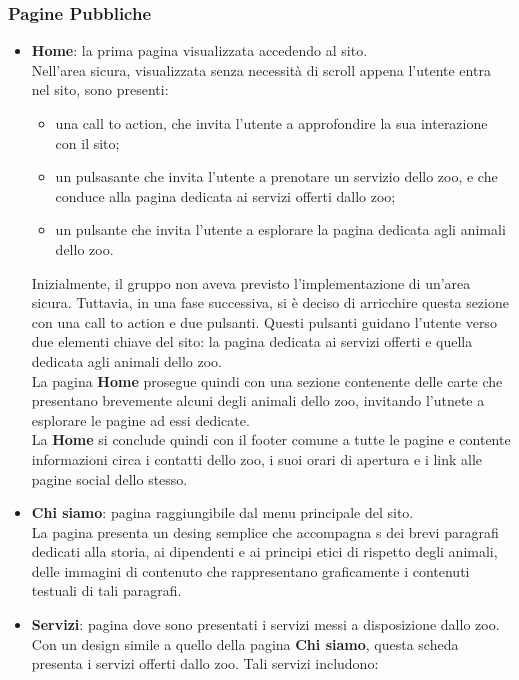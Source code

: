 \subsubsection{Pagine Pubbliche}
\begin{itemize}
    \item \textbf{Home}: la prima pagina visualizzata accedendo al sito.\\
    Nell'area sicura, visualizzata senza necessità di scroll appena l'utente entra nel sito, sono presenti: 
    \begin{itemize}
        \item una call to action, che invita l'utente a approfondire la sua interazione con il sito; 
        \item un pulsasante che invita l'utente a prenotare un servizio dello zoo, e che conduce alla pagina dedicata ai servizi offerti dallo zoo; 
        \item un pulsante che invita l'utente a esplorare la pagina dedicata agli animali dello zoo.
    \end{itemize}
    Inizialmente, il gruppo non aveva previsto l'implementazione di un'area sicura. Tuttavia, in una fase successiva, si è deciso di arricchire questa sezione con una call to action e due pulsanti. Questi pulsanti guidano l'utente verso due elementi chiave del sito: la pagina dedicata ai servizi offerti e quella dedicata agli animali dello zoo.\\
    La pagina \textbf{Home} prosegue quindi con una sezione contenente delle carte che presentano brevemente alcuni degli animali dello zoo, invitando l'utnete a esplorare le pagine ad essi dedicate.\\
    La \textbf{Home} si conclude quindi con il footer comune a tutte le pagine e contente informazioni circa i contatti dello zoo, i suoi orari di apertura e i link alle pagine social dello stesso.
    \item \textbf{Chi siamo}: pagina raggiungibile dal menu principale del sito.\\
    La pagina presenta un desing semplice che accompagna s dei brevi paragrafi dedicati alla storia, ai dipendenti e ai principi etici di rispetto degli animali, delle immagini di contenuto che rappresentano graficamente i contenuti testuali di tali paragrafi.\\
    \item \textbf{Servizi}: pagina dove sono presentati i servizi messi a disposizione dallo zoo.\\
    Con un design simile a quello della pagina \textbf{Chi siamo}, questa scheda presenta i servizi offerti dallo zoo. Tali servizi includono:

\end{itemize}
